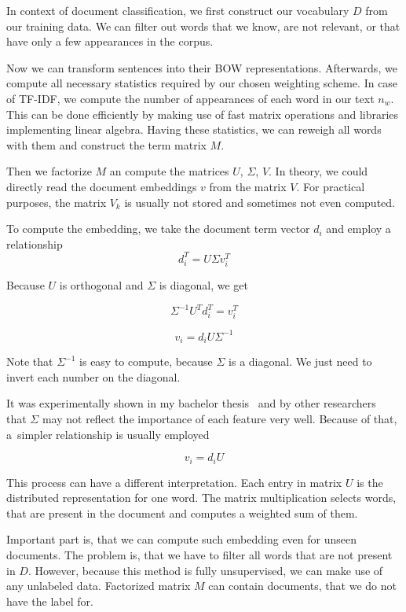     In context of document classification, we first construct our vocabulary $D$ from our training data. 
    We can filter out words that we know, are not relevant, or that have only a few appearances in the corpus.
    
    Now we can transform sentences into their BOW representations.
    Afterwards, we compute all necessary statistics required by our chosen weighting scheme.
    In case of TF-IDF, we compute the number of appearances of each word in our text $n_w$. 
    This can be done efficiently by making use of fast matrix operations and libraries implementing linear algebra.
    Having these statistics, we can reweigh all words with them and construct the term matrix $M$.
    
    Then we factorize $M$ an compute the matrices $U$, $\Sigma$, $V$. 
    In theory, we could directly read the document embeddings $v$ from the matrix $V$.
    For practical purposes, the matrix $V_k$ is usually not stored and sometimes not even computed. 
    
    To compute the embedding, we take the document term vector $d_i$ and employ a relationship $$d_i^T = U \Sigma v_i^T$$
    
    Because $U$ is orthogonal and $\Sigma$ is diagonal, we get
    
    $$\Sigma^{-1} U^T d_i^T = v_i^T $$

    $$v_i = d_i U \Sigma^{-1} $$
    
    Note that $\Sigma^{-1}$ is easy to compute, because $\Sigma$ is a diagonal. 
    We just need to invert each number on the diagonal.  
    
    It was experimentally shown in my bachelor thesis~\cite{macko2016} 
    and by other researchers~\cite{levy2015improving} that $\Sigma$ may not reflect the importance of each feature very well.
    Because of that, a~simpler relationship is usually employed
    
    $$v_i = d_i U $$
    
    This process can have a different interpretation.
    Each entry in matrix $U$ is the distributed representation for one word.
    The matrix multiplication selects words, that are present in the document and computes a weighted sum of them.
    
    Important part is, that we can compute such embedding even for unseen documents.
    The problem is, that we have to filter all words that are not present in $D$. 
    However, because this method is fully unsupervised, we can make use of any unlabeled data. 
    Factorized matrix $M$ can contain documents, that we do not have the label for.
    

